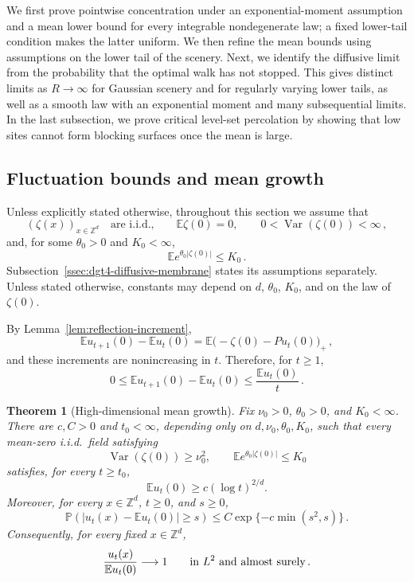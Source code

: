 \documentclass[11pt]{amsart}
\theoremstyle{plain}
\newtheorem{theorem}{Theorem}[section]
\theoremstyle{definition}
\newcommand{\Z}{\mathbb{Z}}
\newcommand{\E}{\mathbb{E}}
\renewcommand{\P}{\mathbb{P}}
\DeclareMathOperator{\Var}{Var}
\begin{document}
We first prove pointwise concentration under an exponential-moment assumption
and a mean lower bound for every integrable nondegenerate law; a fixed
lower-tail condition makes the latter uniform. We then refine the mean
bounds using assumptions on the lower tail of the scenery. Next, we
identify the diffusive limit from the probability that the optimal walk has
not stopped. This gives distinct limits as $R\to\infty$ for Gaussian
scenery and for regularly varying lower tails, as well as a smooth law with an exponential moment and many subsequential limits. In
the last subsection, we prove critical level-set percolation by showing that
low sites cannot form blocking surfaces once the mean is large.

\subsection{Fluctuation bounds and mean growth}\label{ssec:expl-d5}

	Unless explicitly stated otherwise, throughout this section we assume that
	\[
		(\zeta(x))_{x\in\Z^d}\quad\text{are i.i.d.,}\qquad
		\E\zeta(0)=0 ,\qquad 0<\Var(\zeta(0))<\infty\, ,
	\]
	and, for some $\theta_0>0$ and $K_0<\infty$,
	\begin{equation}\label{eq:dgt4-exp-moment}
		\E e^{\theta_0|\zeta(0)|}\leq K_0\, .
	\end{equation}
	Subsection~\ref{ssec:dgt4-diffusive-membrane} states its assumptions
	separately. Unless stated otherwise, constants may depend on $d$,
	$\theta_0$, $K_0$, and on the law of $\zeta(0)$.

By Lemma~\ref{lem:reflection-increment},
\begin{equation}\label{eq:dgt4-height-increment}
	\E u_{t+1}(0)-\E u_t(0)
	=
	\E\bigl(-\zeta(0)-Pu_t(0)\bigr)_+\, ,
\end{equation}
and these increments are nonincreasing in $t$. Therefore, for
$t\geq1$,
\begin{equation}\label{eq:dgt4-mean-increment-bound}
	0\leq
	\E u_{t+1}(0)-\E u_t(0)
	\leq\frac{\E u_t(0)}t\, .
\end{equation}

	\begin{theorem}[High-dimensional mean growth]\label{thm:dgt4-height-lower}
		Fix $\nu_0>0$, $\theta_0>0$, and $K_0<\infty$. There are
		$c,C>0$ and $t_0<\infty$, depending only on
		$d,\nu_0,\theta_0,K_0$, such that every mean-zero i.i.d.\ field satisfying
		\[
			\Var(\zeta(0))\geq\nu_0^2,
			\qquad
			\E e^{\theta_0|\zeta(0)|}\leq K_0
		\]
		satisfies, for every $t\geq t_0$,
		\begin{equation}\label{eq:dgt4-universal-mean-lower}
			\E u_t(0)\geq c(\log t)^{2/d}.
		\end{equation}
			Moreover, for every $x\in\Z^d$, $t\geq0$, and $s\geq0$,
			\begin{equation}\label{eq:dgt4-pointwise-concentration}
				\P\left(|u_t(x)-\E u_t(0)|\geq s\right)
				\leq C\exp\{-c\min(s^2,s)\}\, .
			\end{equation}
			Consequently, for every fixed $x\in\Z^d$,
			\[
				\frac{u_t(x)}{\E u_t(0)}\longrightarrow1
				\qquad\textup{in $L^2$ and almost surely}\, .
			\]
		\end{theorem}
\end{document}
